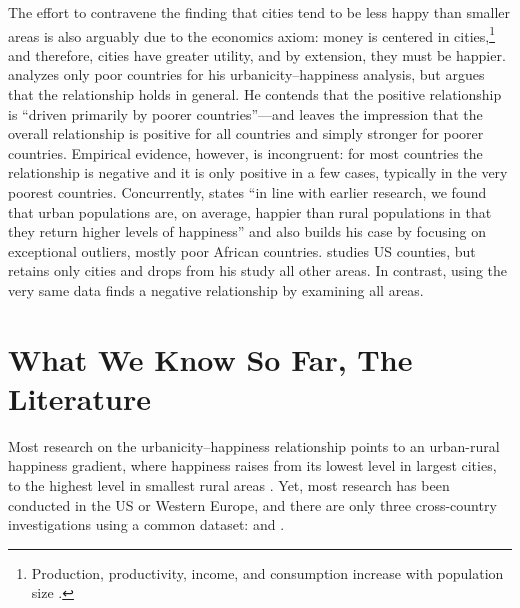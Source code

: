 \documentclass[10pt, letterpaper]{article}
\begin{document}
The effort to contravene the finding that cities tend to be less happy than
smaller areas is also arguably due to the economics axiom: money is centered in cities,\footnote{Production, productivity, income, and consumption increase with population size \citep{glaeser11C,glaeser07,glaeser01,rosenthal02,rosenthal03,rosenthal08}.} and therefore, cities have greater utility, and by extension, they must be happier. 
%
 \citet{glaeser11} analyzes only poor countries for his urbanicity--happiness
 analysis, but argues that the relationship holds in general. He contends that
 the positive relationship is ``driven primarily by poorer countries''---and
 leaves the impression that the overall relationship is positive for all
 countries and simply stronger for poorer countries. Empirical evidence,
 however, is incongruent: for most countries the relationship is negative and it
 is only positive in a few cases, typically in the very poorest
 countries. Concurrently, \citet{burger20} states ``in line with earlier
 research, we found that urban populations are, on average, happier than rural
 populations in that they return higher levels of happiness'' and also builds his case by focusing on exceptional outliers, mostly poor African countries. \citet{glaeser14} studies US counties, but retains only cities and drops from his study all other areas. %
 In contrast, \citet{aok_brfss_city_cize16} using the very same data finds a negative relationship by examining all areas. 



\section*{What We Know So Far, The Literature}

Most research on the urbanicity--happiness relationship points to an urban-rural happiness gradient, where happiness raises from its lowest level in largest cities, to the highest level in smallest rural areas
\citep[e.g.,][]{campbell76etal,aok11a, aok_brfss_city_cize16,aok20}. 
%
Yet, most research has been conducted in the US or Western Europe, and there are only three cross-country investigations using a common dataset: \citet{aokcities,easterlin10al} and \citet{burger20}.
\end{document}
